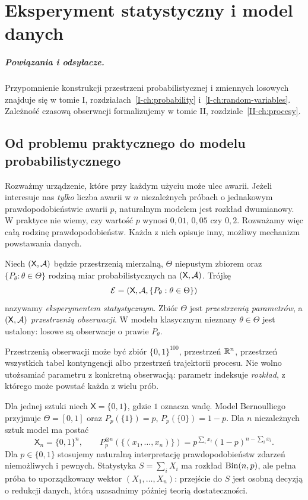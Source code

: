 \chapter{Eksperyment statystyczny i model danych}
\label{ch:eksperyment}
\paragraph{Powiązania i odsyłacze.} Przypomnienie konstrukcji przestrzeni probabilistycznej i zmiennych losowych znajduje się w tomie I, rozdziałach~\ref{I-ch:probability} i~\ref{I-ch:random-variables}. Zależność czasową obserwacji formalizujemy w tomie II, rozdziale~\ref{II-ch:procesy}.

\section{Od problemu praktycznego do modelu probabilistycznego}
Rozważmy urządzenie, które przy każdym użyciu może ulec awarii. Jeżeli interesuje nas \emph{tylko} liczba awarii w $n$ niezależnych próbach o jednakowym prawdopodobieństwie awarii $p$, naturalnym modelem jest rozkład dwumianowy. W praktyce nie wiemy, czy wartość $p$ wynosi $0{,}01$, $0{,}05$ czy $0{,}2$. Rozważamy więc całą rodzinę prawdopodobieństw. Każda z nich opisuje inny, możliwy mechanizm powstawania danych.

\begin{definicja}\label{def:eksperyment}
Niech $(\mathsf X,\mathcal A)$ będzie przestrzenią mierzalną, $\Theta$ niepustym zbiorem oraz $\{P_\theta:\theta\in\Theta\}$ rodziną miar probabilistycznych na $(\mathsf X,\mathcal A)$. Trójkę
\[
\mathcal E=(\mathsf X,\mathcal A,\{P_\theta:\theta\in\Theta\})
\]
nazywamy \emph{eksperymentem statystycznym}. Zbiór $\Theta$ jest \emph{przestrzenią parametrów}, a $(\mathsf X,\mathcal A)$ \emph{przestrzenią obserwacji}. W modelu klasycznym nieznany $\theta\in\Theta$ jest ustalony: losowe są obserwacje o prawie $P_\theta$.
\end{definicja}

Przestrzenią obserwacji może być zbiór $\{0,1\}^{100}$, przestrzeń $\mathbb R^n$, przestrzeń wszystkich tabel kontyngencji albo przestrzeń trajektorii procesu. Nie wolno utożsamiać parametru z konkretną obserwacją: parametr indeksuje \emph{rozkład}, z którego może powstać każda z wielu prób.

\begin{przyklad}\label{ex:bernoulli-exp}
Dla jednej sztuki niech $\mathsf X=\{0,1\}$, gdzie $1$ oznacza wadę. Model Bernoulliego przyjmuje $\Theta=[0,1]$ oraz $P_p(\{1\})=p$, $P_p(\{0\})=1-p$. Dla $n$ niezależnych sztuk model ma postać
\[
\mathsf X_n=\{0,1\}^n,\qquad
P_p^{\otimes n}(\{(x_1,\ldots,x_n)\})=p^{\sum_i x_i}(1-p)^{n-\sum_i x_i}.
\]
Dla $p\in\{0,1\}$ stosujemy naturalną interpretację prawdopodobieństw zdarzeń niemożliwych i pewnych. Statystyka $S=\sum_iX_i$ ma rozkład $\operatorname{Bin}(n,p)$, ale pełna próba to uporządkowany wektor $(X_1,\ldots,X_n)$: przejście do $S$ jest osobną decyzją o redukcji danych, którą uzasadnimy później teorią dostateczności.
\end{przyklad}

